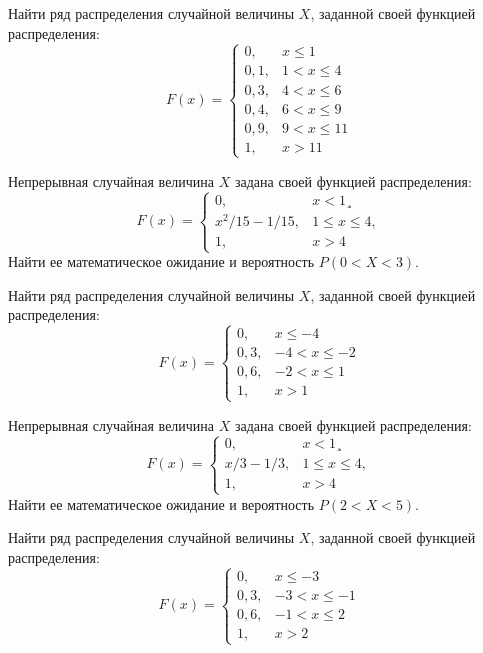 \vfill

\newpage\setcounter{zad}{0}

\z Найти ряд распределения случайной величины $X$, заданной своей функцией распределения: $$ F(x) = \begin{cases}0, & x \leqslant 1 \\ 0{,}1, & 1 < x \leqslant 4 \\ 0{,}3, & 4 < x \leqslant 6 \\ 0{,}4, & 6 < x \leqslant 9 \\ 0{,}9, & 9 < x \leqslant 11 \\ 1, & x > 11 \end{cases} $$


\vfill

\z Непрерывная случайная величина $X$ задана своей функцией распределения: $$ F(x) = \begin{cases}0, & x < 1¸\\ x^2/15-1/15, & 1 \leqslant x \leqslant 4, \\ 1, & x > 4 \end{cases} $$ Найти ее математическое ожидание и вероятность $P(0 < X < 3)$.
 

\vfill

\newpage\setcounter{zad}{0}

\z Найти ряд распределения случайной величины $X$, заданной своей функцией распределения: $$ F(x) = \begin{cases}0, & x \leqslant -4 \\ 0{,}3, & -4 < x \leqslant -2 \\ 0{,}6, & -2 < x \leqslant 1 \\ 1, & x > 1 \end{cases} $$


\vfill

\z Непрерывная случайная величина $X$ задана своей функцией распределения: $$ F(x) = \begin{cases}0, & x < 1¸\\ x/3-1/3, & 1 \leqslant x \leqslant 4, \\ 1, & x > 4 \end{cases} $$ Найти ее математическое ожидание и вероятность $P(2 < X < 5)$.
 

\vfill

\newpage\setcounter{zad}{0}

\z Найти ряд распределения случайной величины $X$, заданной своей функцией распределения: $$ F(x) = \begin{cases}0, & x \leqslant -3 \\ 0{,}3, & -3 < x \leqslant -1 \\ 0{,}6, & -1 < x \leqslant 2 \\ 1, & x > 2 \end{cases} $$


